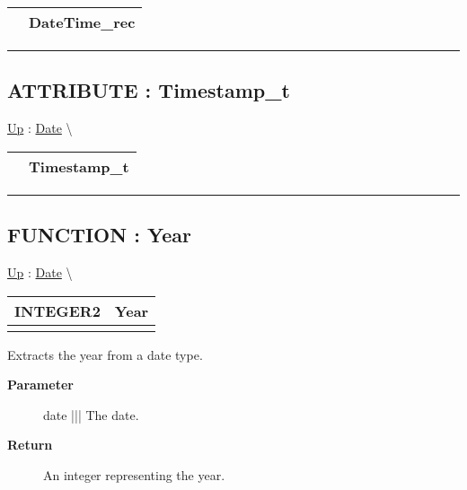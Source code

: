 {\renewcommand{\arraystretch}{1.5}
\begin{tabularx}{\textwidth}{|>{\raggedright\arraybackslash}l|X|}
\hline
\hspace{0pt} & DateTime\_rec \\
\hline
\end{tabularx}
}

\par


\rule{\linewidth}{0.5pt}
\subsection*{ATTRIBUTE : Timestamp\_t}
\hypertarget{ecldoc:date.timestamp_t}{}
\hyperlink{ecldoc:Date}{Up} :
\hspace{0pt} \hyperlink{ecldoc:Date}{Date} \textbackslash 

{\renewcommand{\arraystretch}{1.5}
\begin{tabularx}{\textwidth}{|>{\raggedright\arraybackslash}l|X|}
\hline
\hspace{0pt} & Timestamp\_t \\
\hline
\end{tabularx}
}

\par


\rule{\linewidth}{0.5pt}
\subsection*{FUNCTION : Year}
\hypertarget{ecldoc:date.year}{}
\hyperlink{ecldoc:Date}{Up} :
\hspace{0pt} \hyperlink{ecldoc:Date}{Date} \textbackslash 

{\renewcommand{\arraystretch}{1.5}
\begin{tabularx}{\textwidth}{|>{\raggedright\arraybackslash}l|X|}
\hline
\hspace{0pt}INTEGER2 & Year \\
\hline
\multicolumn{2}{|>{\raggedright\arraybackslash}X|}{\hspace{0pt}(Date\_t date)} \\
\hline
\end{tabularx}
}

\par
Extracts the year from a date type.

\par
\begin{description}
\item [\textbf{Parameter}] date ||| The date.
\item [\textbf{Return}] An integer representing the year.
\end{description}

